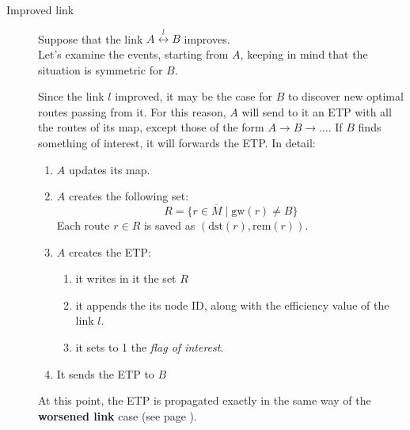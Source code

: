\documentclass[a4paper]{article}
\newcommand{\T}[1]{\textrm{#1}}
\def\ove#1{{\overline{#1}}}
\begin{document}
\begin{description}
		\item[Improved link]
	\label{ilink}
		Suppose that the link $A
		\stackrel{l}{\leftrightarrow} B$ improves.\\
		Let's examine the events, starting from $A$, keeping in mind
		that the situation is symmetric for $B$.

		Since the link $l$ improved, it may be the case for $B$ to
		discover new optimal routes passing from it.
		For this reason, $A$ will
		send to it an ETP with all the routes of its map, except those of the form
		$A\rightarrow B\rightarrow \dots$. If $B$ finds
		something of interest, it will forwards the ETP. In detail:
		\begin{enumerate}
			\item $A$ updates its map.
			\item $A$ creates the following set:
			      \[
			      R=\{r\in \ove M\;|\; \T{gw}(r)\neq B\}
			      \]
			      Each route $r\in R$ is saved as $(\T{dst}(r), \T{rem}(r))$.
		      \item $A$ creates the ETP:
			\begin{enumerate}
				\item it writes in it the set $R$
				\item it appends the its node ID, along with the efficiency
					value of the link $l$.
				\item it sets to 1 the \emph{flag of interest}.
			\end{enumerate}
		      \item It sends the ETP to $B$
		\end{enumerate}
		At this point, the ETP is propagated exactly in the same way
		of the \textbf{worsened link} case (see page
		\pageref{wlink}).\\


\end{description}
\end{document}
